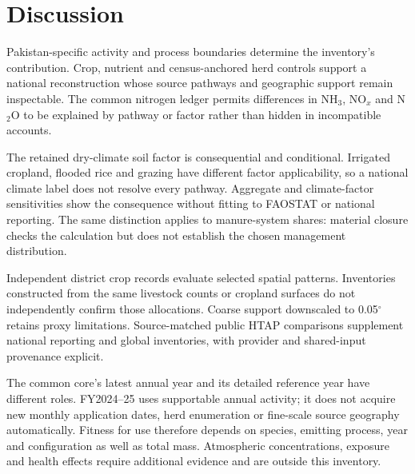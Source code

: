 \section{Discussion}
\label{sec:discussion}
Pakistan-specific activity and process boundaries determine the inventory's contribution. Crop, nutrient and census-anchored herd controls support a national reconstruction whose source pathways and geographic support remain inspectable. The common nitrogen ledger permits differences in NH$_3$, NO$_x$ and N$_2$O to be explained by pathway or factor rather than hidden in incompatible accounts.

The retained dry-climate soil factor is consequential and conditional. Irrigated cropland, flooded rice and grazing have different factor applicability, so a national climate label does not resolve every pathway. Aggregate and climate-factor sensitivities show the consequence without fitting to FAOSTAT or national reporting. The same distinction applies to manure-system shares: material closure checks the calculation but does not establish the chosen management distribution.

Independent district crop records evaluate selected spatial patterns. Inventories constructed from the same livestock counts or cropland surfaces do not independently confirm those allocations. Coarse support downscaled to 0.05$^\circ$ retains proxy limitations. Source-matched public HTAP comparisons supplement national reporting and global inventories, with provider and shared-input provenance explicit.

The common core's latest annual year and its detailed reference year have different roles. FY2024--25 uses supportable annual activity; it does not acquire new monthly application dates, herd enumeration or fine-scale source geography automatically. Fitness for use therefore depends on species, emitting process, year and configuration as well as total mass. Atmospheric concentrations, exposure and health effects require additional evidence and are outside this inventory.

